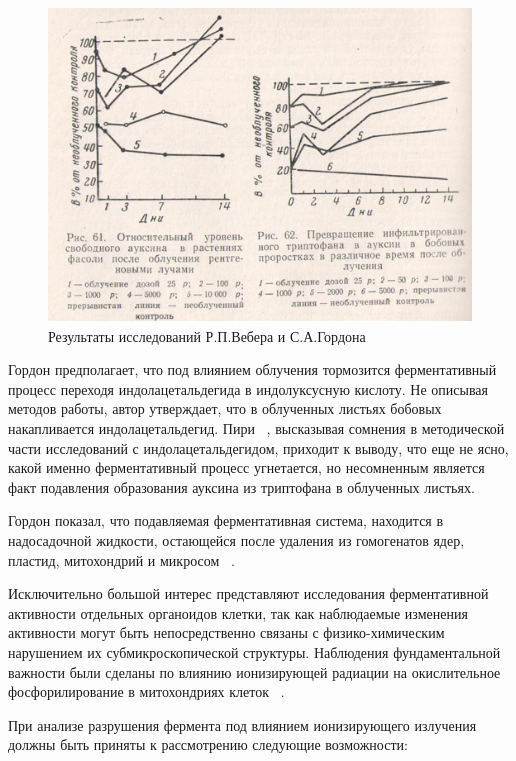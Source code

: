 \documentclass[11pt]{article}
\begin{document}
\begin{figure}[!htpb]
\centering
\includegraphics[scale=0.9]{kuzin}
\caption{Результаты исследований Р.П.Вебера и С.А.Гордона}
\label{}
\end{figure}

Гордон предполагает, что под влиянием облучения тормозится 
ферментативный процесс переходя индолацетальдегида в индолуксусную кислоту. Не описывая методов работы, автор утверждает, что в облученных листьях бобовых накапливается индолацетальдегид. Пири ~\cite{piri}, высказывая сомнения в методической части исследований с индолацетальдегидом, приходит к выводу, что еще не ясно, какой именно ферментативный процесс угнетается, но несомненным является факт подавления образования ауксина из триптофана в облученных листьях. 

Гордон показал, что подавляемая ферментативная система, находится в надосадочной жидкости, остающейся после удаления из гомогенатов ядер, пластид, митохондрий и микросом ~\cite{gordon_PinB}.

Исключительно большой интерес представляют исследования ферментативной активности отдельных органоидов клетки, так как наблюдаемые изменения активности могут быть непосредственно связаны с физико-химическим нарушением их субмикроскопической структуры. Наблюдения фундаментальной важности были сделаны по влиянию ионизирующей радиации на окислительное фосфорилирование в митохондриях клеток ~\cite{kuzin}.

При анализе разрушения фермента под влиянием ионизирующего излучения должны быть приняты к рассмотрению следующие возможности:
\end{document}
